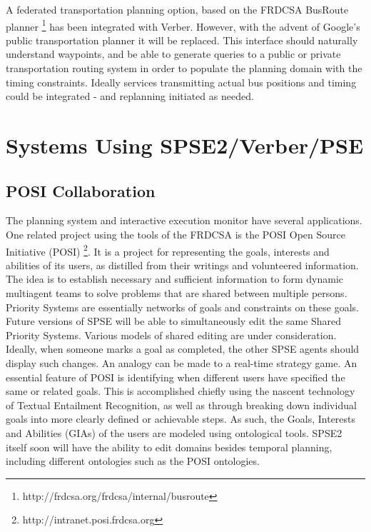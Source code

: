 \documentclass[letterpaper]{article}
\begin{document}
\noindent A federated transportation planning option, based on the
FRDCSA BusRoute planner
\footnote{http://frdcsa.org/frdcsa/internal/busroute} has been
integrated with Verber.  However, with the advent of Google's public
transportation planner it will be replaced.  This interface should
naturally understand waypoints, and be able to generate queries to a
public or private transportation routing system in order to populate
the planning domain with the timing constraints.  Ideally services
transmitting actual bus positions and timing could be integrated - and
replanning initiated as needed.

\section{Systems Using SPSE2/Verber/PSE}

\subsection{POSI Collaboration}

\noindent The planning system and interactive execution monitor have
several applications.  One related project using the tools of the
FRDCSA is the POSI Open Source Initiative (POSI)
\footnote{http://intranet.posi.frdcsa.org}. It is a project for
representing the goals, interests and abilities of its users, as
distilled from their writings and volunteered information.  The idea
is to establish necessary and sufficient information to form dynamic
multiagent teams to solve problems that are shared between multiple
persons.  Priority Systems are essentially networks of goals and
constraints on these goals.  Future versions of SPSE will be able to
simultaneously edit the same Shared Priority Systems.  Various models
of shared editing are under consideration.  Ideally, when someone
marks a goal as completed, the other SPSE agents should display such
changes.  An analogy can be made to a real-time strategy game.  An
essential feature of POSI is identifying when different users have
specified the same or related goals.  This is accomplished chiefly
using the nascent technology of Textual Entailment Recognition, as
well as through breaking down individual goals into more clearly
defined or achievable steps.  As such, the Goals, Interests and
Abilities (GIAs) of the users are modeled using ontological tools.
SPSE2 itself soon will have the ability to edit domains besides
temporal planning, including different ontologies such as the POSI
ontologies.
\end{document}
